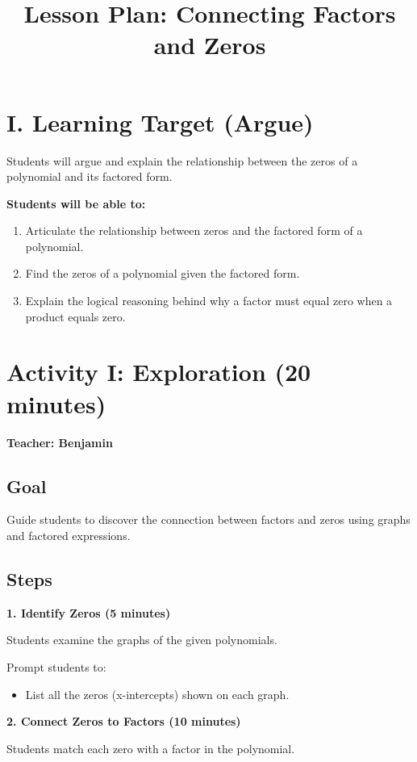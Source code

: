 \documentclass[11pt]{article}
\title{Lesson Plan: Connecting Factors and Zeros}
\date{}
\begin{document}
\maketitle

\section*{I. Learning Target (Argue)}

Students will argue and explain the relationship between the zeros of a polynomial and its factored form.

\textbf{Students will be able to:}

\begin{enumerate}[label=\alph*.]
\item Articulate the relationship between zeros and the factored form of a polynomial.
\item Find the zeros of a polynomial given the factored form.
\item Explain the logical reasoning behind why a factor must equal zero when a product equals zero.
\end{enumerate}

\section*{Activity I: Exploration (20 minutes)}
\textbf{Teacher: Benjamin}

\subsection*{Goal}
Guide students to discover the connection between factors and zeros using graphs and factored expressions.

\subsection*{Steps}

\textbf{1. Identify Zeros (5 minutes)}

Students examine the graphs of the given polynomials.

Prompt students to:
\begin{itemize}
\item List all the zeros (x-intercepts) shown on each graph.
\end{itemize}

\textbf{2. Connect Zeros to Factors (10 minutes)}

Students match each zero with a factor in the polynomial.
\end{document}
